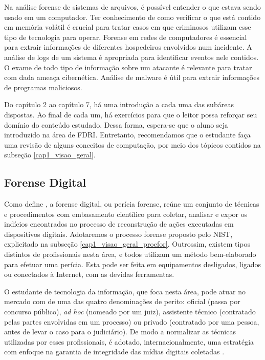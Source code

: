     \vspace{4mm}
    
    \hspace{1cm}
    Na análise forense de sistemas de arquivos, é possível entender o que estava sendo usado em um computador. Ter conhecimento de como verificar o que está contido em memória volátil é crucial para tratar casos em que criminosos utilizam esse tipo de tecnologia para operar. Forense em redes de computadores é essencial para extrair informações de diferentes hospedeiros envolvidos num incidente. A análise de logs de um sistema é apropriada para identificar eventos nele contidos. O exame de todo tipo de informação sobre um atacante é relevante para tratar com dada ameaça cibernética. Análise de malware é útil para extrair informações de programas maliciosos.
    
    \vspace{4mm}
	
	\hspace{1cm}
	Do capítulo 2 ao capítulo 7, há uma introdução a cada uma das subáreas dispostas. Ao final de cada um, há exercícios para que o leitor possa reforçar seu domínio do conteúdo estudado. Dessa forma, espera-se que o aluno seja introduzido na área de FDRI. Entretanto, recomendamos que o estudante faça uma revisão de alguns conceitos de computação, por meio dos tópicos contidos na subseção \ref{cap1_visao_geral}.
	
   \subsection{Forense Digital}
    
    \hspace{1cm}
    Como define , a forense digital, ou perícia forense, reúne um conjunto de técnicas e procedimentos com embasamento científico para coletar, analisar e expor os indícios encontrados no processo de reconstrução de ações executadas em dispositivos digitais. Adotaremos o processo forense proposto pelo NIST, explicitado na subseção \ref{cap1_visao_geral_procfor}. Outrossim, existem tipos distintos de profissionais nesta área, e todos utilizam um método bem-elaborado para efetuar uma perícia. Esta pode ser feita em equipamentos desligados, ligados ou conectados à Internet, com as devidas ferramentas.
    
    \vspace{4mm}
        
    \hspace{1cm}
    O estudante de tecnologia da informação, que foca nesta área, pode atuar no mercado com de uma das quatro denominações de perito: oficial (passa por concurso público), \textit{ad hoc} (nomeado por um juiz), assistente técnico (contratado pelas partes envolvidas em um processo) ou privado (contratado por uma pessoa, antes de levar o caso para o judiciário). De modo a normalizar as técnicas utilizadas por esses profissionais, é adotado, internacionalmente, uma estratégia com enfoque na garantia de integridade das mídias digitais coletadas \cite{vecchia2019}.
    

